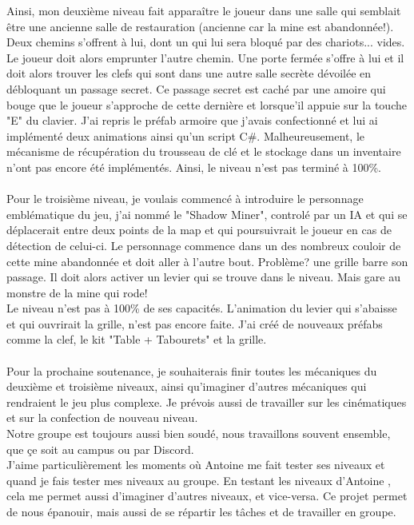\documentclass[titlepage, 13px, a4paper]{report}
\begin{document}
Ainsi, mon deuxième niveau fait apparaître le joueur dans une salle qui semblait être une ancienne salle de restauration 
(ancienne car la mine est abandonnée!). Deux chemins s'offrent à lui, dont un qui lui sera bloqué par des chariots... vides. 
Le joueur doit alors emprunter l'autre chemin. Une porte fermée s'offre à lui et il doit alors trouver les clefs 
qui sont dans une autre salle secrète dévoilée en débloquant un passage secret. Ce passage secret est caché 
par une amoire qui bouge que le joueur s'approche de cette dernière et lorsque'il appuie sur la 
touche "E" du clavier. J'ai repris le préfab armoire que j'avais confectionné et lui ai implémenté deux animations ainsi qu'un script C\#. 
Malheureusement, le mécanisme de récupération du trousseau de clé et le stockage dans un inventaire n'ont pas encore été implémentés. 
Ainsi, le niveau n'est pas terminé à 100\%. \\ \\

Pour le troisième niveau, je voulais commencé à introduire le personnage emblématique du jeu, j'ai nommé le "Shadow Miner",
controlé par un IA et qui se déplacerait entre deux points de la map et qui poursuivrait le joueur en cas de détection de celui-ci. 
Le personnage commence dans un des nombreux couloir de cette mine abandonnée et doit aller à l'autre bout. 
Problème? une grille barre son passage. Il doit alors activer un levier qui se trouve dans le niveau. 
Mais gare au monstre de la mine qui rode! \\
Le niveau n'est pas à 100\% de ses capacités. L'animation du levier qui s'abaisse et qui ouvrirait la grille, n'est pas encore faite. 
J'ai créé de nouveaux préfabs comme la clef, le kit "Table + Tabourets" et la grille. \\ \\

Pour la prochaine soutenance, 
je souhaiterais finir toutes les mécaniques du deuxième et troisième niveaux, ainsi qu'imaginer d'autres mécaniques qui rendraient
le jeu plus complexe. Je prévois aussi de travailler sur les cinématiques et sur la confection de nouveau niveau. \\
Notre groupe est toujours aussi bien soudé, nous travaillons souvent ensemble, que çe soit au campus ou par Discord. \\
J'aime particulièrement les moments où Antoine me fait tester ses niveaux et quand je fais tester mes niveaux au groupe. 
En testant les niveaux d'Antoine , cela me permet aussi d'imaginer d'autres niveaux, et vice-versa. 
Ce projet permet de nous épanouir, mais aussi de se répartir les tâches et de travailler en groupe.
\end{document}
